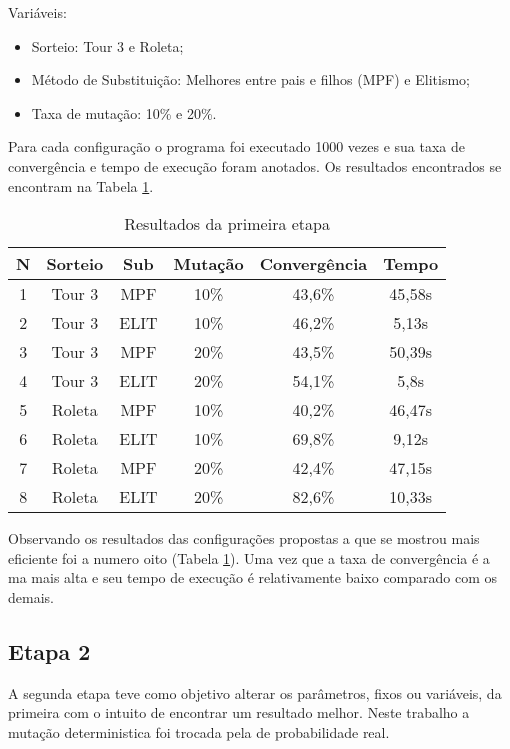 \documentclass[a4paper, 12pt]{article}
\begin{document}
    Variáveis:
    \begin{itemize}
    \item Sorteio: Tour 3 e Roleta;
    \item Método de Substituição: Melhores entre pais e filhos (MPF) e Elitismo;
    \item Taxa de mutação: 10\% e 20\%.
    \end{itemize}

    Para cada configuração o programa foi executado 1000 vezes e sua taxa de
     convergência e tempo de execução foram anotados. Os resultados encontrados
     se encontram na Tabela \ref{tab:etapa1}.

    \begin{table}[h]
      \centering
      \begin{tabular}{|c|c|c|c|c|c|}
        \hline
        N & Sorteio & Sub & Mutação & Convergência & Tempo \\
        \hline
        1 & Tour 3 & MPF & 10\% & 43,6\% & 45,58s \\
        \hline
        2 & Tour 3 & ELIT & 10\% & 46,2\% & 5,13s \\
        \hline
        3 & Tour 3 & MPF & 20\% & 43,5\% & 50,39s \\
        \hline
        4 & Tour 3 & ELIT & 20\% & 54,1\% & 5,8s \\
        \hline
        5 & Roleta & MPF & 10\% & 40,2\% & 46,47s \\
        \hline
        6 & Roleta & ELIT & 10\% & 69,8\% & 9,12s \\
        \hline
        7 & Roleta & MPF & 20\% & 42,4\% & 47,15s \\
        \hline
        8 & Roleta & ELIT & 20\% & 82,6\% & 10,33s \\
        \hline
      \end{tabular}
      \caption{Resultados da primeira etapa}
      \label{tab:etapa1}
    \end{table}

  Observando os resultados das configurações propostas a que se mostrou mais
  eficiente foi a numero oito (Tabela \ref{tab:etapa1}). Uma vez que a taxa de convergência é a
  ma mais alta e seu tempo de execução é relativamente baixo comparado com os demais.

  \subsection{Etapa 2}
  A segunda etapa teve como objetivo alterar os parâmetros, fixos ou variáveis,
  da primeira com o intuito de encontrar um resultado melhor. Neste trabalho
  a mutação deterministica foi trocada pela de probabilidade real.
\end{document}
